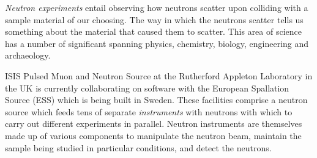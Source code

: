 \textit{Neutron experiments} entail observing how neutrons scatter upon colliding with a sample material of our choosing. The way in which the neutrons scatter tells us something about the material that caused them to scatter. This area of science has a number of significant spanning physics, chemistry, biology, engineering and archaeology.

ISIS Pulsed Muon and Neutron Source at the Rutherford Appleton Laboratory in the UK is currently collaborating on software with the European Spallation Source (ESS) which is being built in Sweden. These facilities comprise a neutron source which feeds tens of separate \textit{instruments} with neutrons with which to carry out different experiments in parallel. Neutron instruments are themselves made up of various components to manipulate the neutron beam, maintain the sample being studied in particular conditions, and detect the neutrons.

